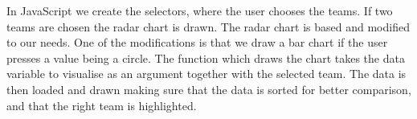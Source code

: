 \documentclass[Report.tex]{subfiles}
\begin{document}
In JavaScript we create the selectors, where the user chooses the teams. If two teams are chosen the radar chart is drawn. The radar chart is based \cite{Radar} and modified to our needs. One of the modifications is that we draw a bar chart if the user presses a value being a circle. The function which draws the chart takes the data variable to visualise as an argument together with the selected team. The data is then loaded and drawn making sure that the data is sorted for better comparison, and that the right team is highlighted.
\end{document}
